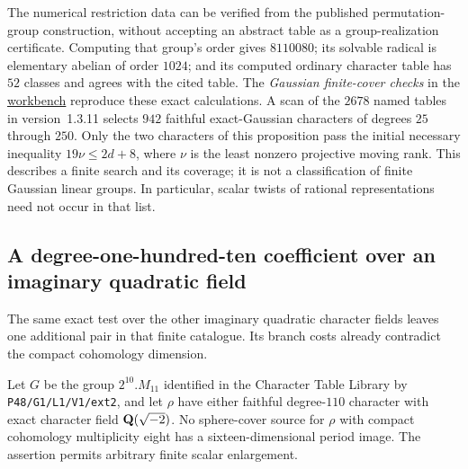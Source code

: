 The numerical restriction data can be verified from the published
permutation-group construction, without accepting an abstract table
as a group-realization certificate. Computing that group's order gives
$8110080$; its solvable radical is elementary abelian of order $1024$;
and its computed ordinary character table has $52$ classes and agrees
with the cited table. The \emph{Gaussian finite-cover checks} in the
\href{\workbenchurl}{workbench} reproduce these exact calculations.
A scan of the $2678$ named tables in version~1.3.11 selects $942$
faithful exact-Gaussian characters of degrees $25$ through $250$.
Only the two characters of this proposition pass the initial necessary
inequality $19\nu\le2d+8$, where $\nu$ is the least nonzero projective
moving rank. This describes a finite search and its coverage; it is
not a classification of finite Gaussian linear groups. In particular,
scalar twists of rational representations need not occur in that list.

\subsection{A degree-one-hundred-ten coefficient over an imaginary quadratic field}

The same exact test over the other imaginary quadratic character
fields leaves one additional pair in that finite catalogue.  Its
branch costs already contradict the compact cohomology dimension.

\begin{proposition}\label{prop:degree110-cover}
Let $G$ be the group $2^{10}.M_{11}$ identified in the Character Table
Library by \texttt{P48/G1/L1/V1/ext2}, and let $\rho$ have either
faithful degree-$110$ character with exact character field
$\mathbf Q(\sqrt{-2})$.  No sphere-cover source for $\rho$ with compact
cohomology multiplicity eight has a sixteen-dimensional period image.
The assertion permits arbitrary finite scalar enlargement.
\end{proposition}

